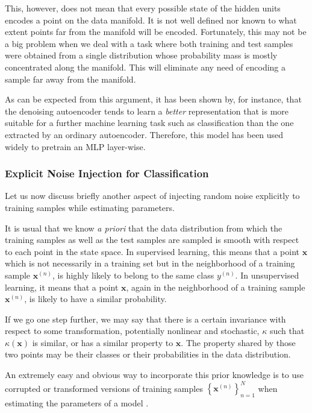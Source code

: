\documentclass[dissertation,nocontribution,draft*]{aaltoseries}
\newcommand{\vect}[1]{\mathbf{#1}}
\newcommand{\vx}[0]{\vect{x}}
\begin{document}
This, however, does not mean that every possible state of
the hidden units encodes a point on the data manifold. It is
not well defined nor known to what extent points far from the
manifold will be encoded. Fortunately, this may not be a big
problem when we deal with a task where both training and
test samples were obtained from a single
distribution whose probability mass is mostly concentrated
along the manifold. This will eliminate any need of encoding
a sample far away from the manifold.

As can be expected from this argument, it has been shown by,
for instance, \citet{Vincent2010}
that the
denoising autoencoder tends to learn a \textit{better}
representation that is more suitable for a further machine
learning task such as classification than the one extracted
by an ordinary autoencoder. Therefore, this model
has been used widely to pretrain an MLP layer-wise.

\subsubsection{Explicit Noise Injection for Classification}
\label{sec:noise_injection}

Let us now discuss briefly another aspect of injecting random
noise explicitly to training samples while estimating
parameters.

It is usual that we know \textit{a priori} that the data
distribution from which the training samples as well as
the test samples are sampled is smooth with respect to each
point in the state space. In supervised learning, this
means that a point $\vx$ which is not necessarily in a
training set but in the neighborhood of a training sample
$\vx^{(n)}$, is highly likely to belong to the same class
$y^{(n)}$. In unsupervised learning, it means that a point
$\vx$, again in the neighborhood of a training sample
$\vx^{(n)}$, is likely to have a similar probability.

If we go one step further, we may say that there is a
certain invariance with respect to some transformation,
potentially nonlinear and stochastic, $\kappa$ such that
$\kappa(\vx)$ is similar, or has a similar property to
$\vx$. The property shared by those two points may be their
classes or their probabilities in the data distribution.

An extremely easy and obvious way to incorporate this prior
knowledge is to use corrupted or transformed versions of
training samples $\left\{ \vx^{(n)} \right\}_{n=1}^N$ when
estimating the parameters of a model \citep[see,
e.g.,][Chapter 5.5]{Bishop2006}. 
\end{document}
